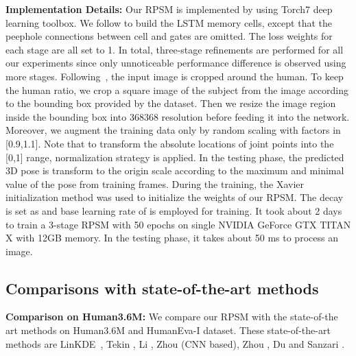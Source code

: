 \documentclass[10pt,twocolumn,letterpaper]{article}
\begin{document}
\textbf{Implementation Details:}
Our RPSM is implemented by using Torch7 \cite{collobert2011torch7} deep learning toolbox. We follow \cite{graves2014towards} to build the LSTM memory cells, except that the peephole connections between cell and gates are omitted. The loss weights  for each stage are all set to 1. In total, three-stage refinements are performed for all our experiments since only unnoticeable performance difference is observed using more stages. 
Following~\cite{zhou2015sparseness,li2015maximum}, the input image is cropped around the human. To keep the human ratio, we crop a square image of the subject from the image according to the bounding box provided by the dataset. 
Then we resize the image region inside the bounding box into 368368 resolution before feeding it into the network. Moreover, we augment the training data only by random scaling with factors in [0.9,1.1]. Note that to transform the absolute locations of joint points into the [0,1] range,  normalization strategy is applied. In the testing phase, the predicted 3D pose is transform to the origin scale according to the maximum and minimal value of the pose from training frames. During the training, the Xavier initialization method \cite{glorot2010understanding} was used to initialize the weights of our RPSM. The decay is set as  and base learning rate of  is employed for training. It took about 2 days to train a 3-stage RPSM with 50 epochs on single NVIDIA GeForce GTX TITAN X with 12GB memory. In the testing phase, it takes about 50 ms to process an image.



\subsection{Comparisons with state-of-the-art methods}



\textbf{Comparison on Human3.6M:}
\label{section:human3.6m_result}
We compare our RPSM with the state-of-the art methods on Human3.6M \cite{huamn3.6m} and HumanEva-I \cite{sigal2010humaneva} dataset. These state-of-the-art methods are LinKDE~\cite{huamn3.6m}, Tekin \etal \cite{Tekin_2016_CVPR}, Li \etal \cite{li2015maximum}, Zhou \etal \cite{zhou2015sparseness} (CNN based), Zhou \etal \cite{zhou2016deep}, Du \etal \cite{DBLP:conf/eccv/DuWLHGWKG16} and Sanzari \etal \cite{DBLP:conf/eccv/SanzariNP16}. 
\end{document}
